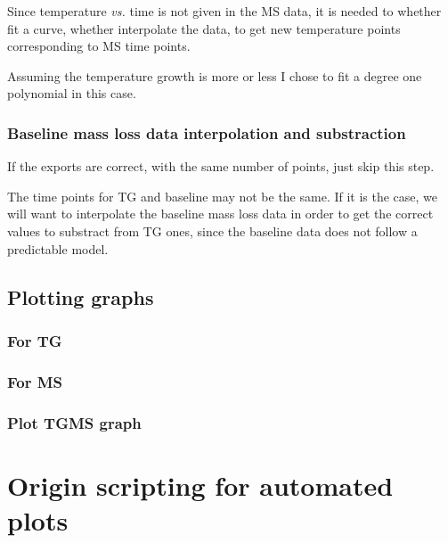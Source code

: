 \documentclass[a4paper, 11pt, raggedright, parskip, sans, colorful]{tufte-style-article}
\begin{document}
Since temperature \textit{vs.} time is not given in the MS data, it is needed to whether fit a curve, whether interpolate the data, to get new temperature points corresponding to MS time points.
 
Assuming the temperature growth is more or less I chose to fit a degree one polynomial in this case.


\subsubsection[Baseline mass loss data interpolation and substraction]{Baseline mass loss data interpolation and substraction}

If the exports are correct, with the same number of points, just skip this step.

The time points for TG and baseline may not be the same. If it is the case, we will want to interpolate the baseline mass loss data in order to get the correct values to substract from TG ones, since the baseline data does not follow a predictable model.


\subsection{Plotting graphs}


\subsubsection{For TG}


\subsubsection{For MS}


\subsubsection{Plot TGMS graph}


\section{Origin scripting for automated plots}
\label{sec:origin_scripting}	
	
\end{document}
